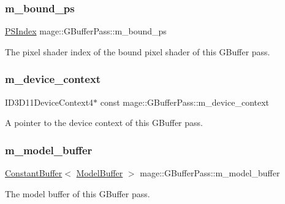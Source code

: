 \subsubsection{\texorpdfstring{m\+\_\+bound\+\_\+ps}{m\_bound\_ps}}
{\footnotesize\ttfamily \hyperlink{classmage_1_1_g_buffer_pass_a1dbae3cb33d9c90ce7eb8c119d576379}{P\+S\+Index} mage\+::\+G\+Buffer\+Pass\+::m\+\_\+bound\+\_\+ps\hspace{0.3cm}{\ttfamily [private]}}

The pixel shader index of the bound pixel shader of this G\+Buffer pass. \hypertarget{classmage_1_1_g_buffer_pass_a56bcb08adf8a9b04a15efe24ef703c32}{}\label{classmage_1_1_g_buffer_pass_a56bcb08adf8a9b04a15efe24ef703c32} 
\subsubsection{\texorpdfstring{m\+\_\+device\+\_\+context}{m\_device\_context}}
{\footnotesize\ttfamily I\+D3\+D11\+Device\+Context4$\ast$ const mage\+::\+G\+Buffer\+Pass\+::m\+\_\+device\+\_\+context\hspace{0.3cm}{\ttfamily [private]}}

A pointer to the device context of this G\+Buffer pass. \hypertarget{classmage_1_1_g_buffer_pass_a0538769957df6740993dbb479b7e05a2}{}\label{classmage_1_1_g_buffer_pass_a0538769957df6740993dbb479b7e05a2} 
\subsubsection{\texorpdfstring{m\+\_\+model\+\_\+buffer}{m\_model\_buffer}}
{\footnotesize\ttfamily \hyperlink{structmage_1_1_constant_buffer}{Constant\+Buffer}$<$ \hyperlink{structmage_1_1_model_buffer}{Model\+Buffer} $>$ mage\+::\+G\+Buffer\+Pass\+::m\+\_\+model\+\_\+buffer\hspace{0.3cm}{\ttfamily [private]}}

The model buffer of this G\+Buffer pass. \hypertarget{classmage_1_1_g_buffer_pass_ae607b9a6dab89d45865dc0ede3212fcd}{}\label{classmage_1_1_g_buffer_pass_ae607b9a6dab89d45865dc0ede3212fcd} 
